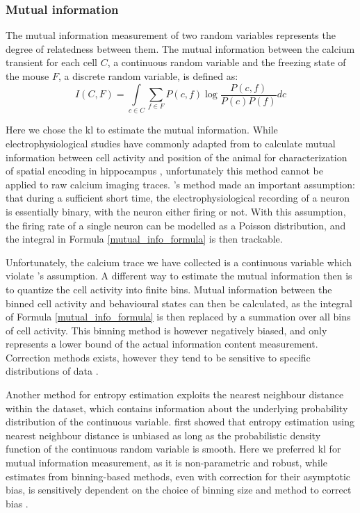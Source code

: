 \subsubsection{Mutual information}

The mutual information measurement of two random variables represents the degree of relatedness between them. The mutual information between the calcium transient for each cell $C$, a continuous random variable and the freezing state of the mouse $F$, a discrete random variable, is defined as:
\begin{equation} \label{mutual_info_formula}
    I(C, F) = \int\limits_{c \in C} \sum_{f \in F} P(c,f)\log\frac{P(c,f)}{P(c)P(f)}dc
\end{equation}

Here we chose the \gls{kl} to estimate the mutual information. While electrophysiological studies have commonly adapted from \citet{skaggs93} to calculate mutual information between cell activity and position of the animal for characterization of spatial encoding in hippocampus \citep[e.g.][]{knierim95, skaggs96, ji07, cheng13, roux17}, unfortunately this method cannot be applied to raw calcium imaging traces. \citet{skaggs93}'s method made an important assumption: that during a sufficient short time, the electrophysiological recording of a neuron is essentially binary, with the neuron either firing or not. With this assumption, the firing rate of a single neuron can be modelled as a Poisson distribution, and the integral in Formula \ref{mutual_info_formula} is then trackable.

Unfortunately, the calcium trace we have collected is a continuous variable which violate \citet{skaggs93}'s assumption. A different way to estimate the mutual information then is to quantize the cell activity into finite bins. Mutual information between the binned cell activity and behavioural states can then be calculated, as the integral of Formula \ref{mutual_info_formula} is then replaced by a summation over all bins of cell activity. This binning method is however negatively biased, and only represents a lower bound of the actual information content measurement. Correction methods exists, however they tend to be sensitive to specific distributions of data \citep{paninski03}.

Another method for entropy estimation exploits the nearest neighbour distance within the dataset, which contains information about the underlying probability distribution of the continuous variable. \citet{kozachenko87} first showed that entropy estimation using nearest neighbour distance is unbiased as long as the probabilistic density function of the continuous random variable is smooth. Here we preferred \gls{kl} for mutual information measurement, as it is non-parametric and robust, while estimates from binning-based methods, even with correction for their asymptotic bias, is sensitively dependent on the choice of binning size and method to correct bias \citep{victor02, ross14}. 

